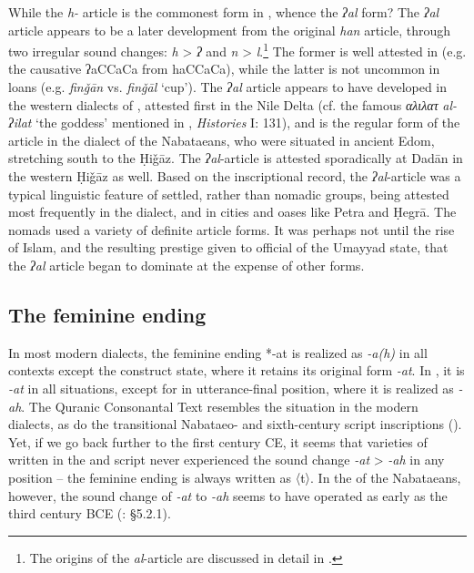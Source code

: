 \documentclass[output=paper]{langsci/langscibook}
\begin{document}
While the \textit{h-} {article} is the commonest form in  , whence the \textit{ʔal} form? The \textit{ʔal} {article} appears to be a later development from the original \textit{han} {article}, through two irregular sound changes: \textit{h} > \textit{ʔ} and \textit{n} > \textit{l}.\footnote{The origins of the \textit{al}-{article} are discussed in detail in \citet{Al-Jalladforthcoming}.} The former is well attested in  (e.g. the {causative} ʔaCCaCa from haCCaCa), while the latter is not uncommon in loans (e.g. \textit{finǧān} vs. \textit{finǧāl} ‘cup’). The \textit{ʔal} {article} appears to have developed in the western dialects of  , attested first in the Nile Delta (cf. the famous \textit{αλιλατ} \textit{al-ʔilat} ‘the goddess’ mentioned in , \textit{Histories} I: 131), and is the regular form of the {article} in the dialect of the Nabataeans, who were situated in ancient Edom, stretching south to the Ḥiǧāz. The \textit{ʔal}-{article} is attested sporadically at Dadān in the western Ḥiǧāz as well. Based on the inscriptional record, the \textit{ʔal}-{article} was a typical linguistic feature of settled, rather than nomadic groups, being attested most frequently in the  dialect, and in cities and oases like Petra and Ḥegrā. The nomads used a variety of {definite} {article} forms. It was perhaps not until the rise of Islam, and the resulting {prestige} given to official  of the Umayyad state, that the \textit{ʔal} {article} began to dominate at the expense of other forms.

\subsection{The feminine ending}
In most modern  dialects, the feminine ending *-at is realized as \textit{-a(h)} in all contexts except the construct state, where it retains its original form \textit{-at}. In  , it is \textit{-at} in all situations, except for in utterance-final position, where it is realized as \textit{-ah}. The Quranic Consonantal Text resembles the situation in the modern dialects, as do the transitional Nabataeo- and sixth-century  script inscriptions (\citealt{Nehmé2017}). Yet, if we go back further to the first century CE, it seems that varieties of  written in the  and  script never experienced the sound change \textit{-at} > \textit{-ah} in any position – the feminine ending is always written as 〈t〉. In the  of the Nabataeans, however, the sound change of \textit{-at} to \textit{-ah} seems to have operated as early as the third century BCE (\citealt{Al-Jallad2017early}: §5.2.1). 
\end{document}
